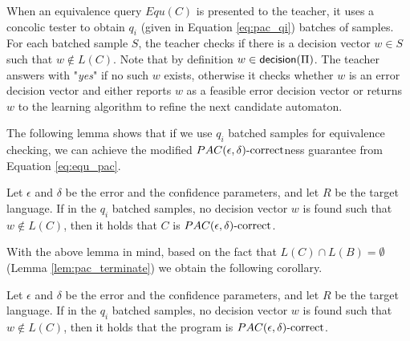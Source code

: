 When an equivalence query $Equ(C)$ is presented to the teacher, it uses a concolic tester to obtain $q_i$ (given in Equation \ref{eq:pac_qi}) batches of samples. For each batched sample $S$, the teacher checks if there is a decision vector $w \in S$ such that $w \notin L(C)$. Note that by definition $w \in \mathsf{decision}(\Pi)$. The teacher answers with "\textit{yes}" if no such $w$ exists, otherwise it checks whether $w$ is an error decision vector and either reports $w$ as a feasible error decision vector or returns $w$ to the learning algorithm to refine the next candidate automaton. 

The following lemma shows that if we use $q_i$ batched samples for equivalence checking, we can achieve the modified $PAC(\epsilon, \delta)\text{-correct}$ness guarantee from Equation \ref{eq:equ_pac}. 

\begin{lemma}\label{lem:equ_C_pac}
Let $\epsilon$ and $\delta$ be the error and the confidence parameters, and let $R$ be the target language. If in the $q_i$ batched samples, no decision vector $w$ is found such that $w \notin L(C)$, then it holds that $C$ is $PAC(\epsilon, \delta)\text{-correct}$.
\end{lemma}

With the above lemma in mind, based on the fact that $L(C) \cap L(B) = \emptyset$ (Lemma \ref{lem:pac_terminate}) we obtain the following corollary.

\begin{corollary}\label{cor:equ_prog_pac}
Let $\epsilon$ and $\delta$ be the error and the confidence parameters, and let $R$ be the target language. If in the $q_i$ batched samples, no decision vector $w$ is found such that $w \notin L(C)$, then it holds that the program is $PAC(\epsilon, \delta)\text{-correct}$.
\end{corollary}